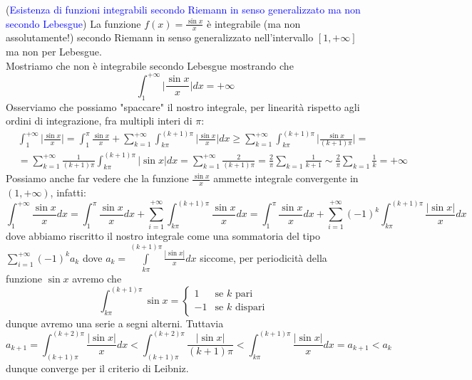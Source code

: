 \begin{remark}(\textcolor{blue}{Esistenza di funzioni integrabili secondo Riemann in senso generalizzato ma non secondo Lebesgue}) 
	La funzione $f(x) = \frac{\sin{x}}{x}$ è integrabile (ma non assolutamente!) secondo Riemann in senso generalizzato nell'intervallo $[1, +\infty]$ ma non per Lebesgue. \\
	Mostriamo che non è integrabile secondo Lebesgue mostrando che
	$$
	\int_1^{+\infty} \Big| \frac{\sin{x}}{x} \Big|dx = +\infty
	$$
	Osserviamo che possiamo "spaccare" il nostro integrale, per linearità rispetto agli ordini di integrazione, fra multipli interi di $\pi$:
	\[\begin{aligned}
	&\int_1^{+\infty} \Big| \frac{\sin{x}}{x} \Big| = \int_1^{\pi} \frac{\sin{x}}{x} + \sum_{k=1}^{+\infty} \int_{k\pi}^{(k+1)\pi} \Big|\frac{\sin{x}}{x} \Big|dx \geq \sum_{k=1}^{+\infty} \int_{k\pi}^{(k+1)\pi} \Big|\frac{\sin{x}}{(k+1)\pi} \Big| = \\
	&=\sum_{k=1}^{+\infty} \frac{1}{(k+1)\pi}\int_{k\pi}^{(k+1)\pi} |\sin{x}|dx = \sum_{k=1}^{+\infty} \frac{2}{(k+1)\pi} = \frac{2}{\pi}\sum_{k=1} \frac{1}{k+1} \sim \frac{2}{\pi} \sum_{k=1} \frac{1}{k} = +\infty
	\end{aligned}\]
	Possiamo anche far vedere che la funzione $\frac{\sin{x}}{x}$ ammette integrale convergente in $(1, +\infty)$, infatti:
	$$
	\int_1^{+\infty} \frac{\sin{x}}{x}dx = \int_1^\pi \frac{\sin{x}}{x}dx + \sum_{i=1}^{+\infty} \int_{k\pi}^{(k+1)\pi} \frac{\sin{x}}{x}dx = \int_1^{\pi} \frac{\sin{x}}{x}dx + \sum_{i=1}^{+\infty} (-1)^k \int_{k\pi}^{(k+1)\pi} \frac{|\sin{x}|}{x}dx
	$$
	dove abbiamo riscritto il nostro integrale come una sommatoria del tipo $\sum\limits_{i=1}^{+\infty} (-1)^k a_k$ dove $a_k = \int\limits_{k\pi}^{(k+1)\pi} \frac{|\sin{x}|}{x}dx$ siccome, per periodicità della funzione $\sin{x}$ avremo che
	\begin{equation*}
		\int_{k\pi}^{(k+1)\pi} \sin{x} = \begin{cases}
			1 & \text{se } k \text{ pari } \\
			-1 & \text{se } k \text{ dispari }
		\end{cases}
	\end{equation*}
	dunque avremo una serie a segni alterni. Tuttavia
	$$
	a_{k+1} = \int_{(k+1)\pi}^{(k+2)\pi} \frac{|\sin{x}|}{x} dx < \int_{(k+1)\pi}^{(k+2)\pi} \frac{|\sin{x}|}{(k+1)\pi} < \int_{k\pi}^{(k+1)\pi} \frac{|\sin{x}|}{x} dx = a_{k+1} < a_k
	$$
	dunque converge per il criterio di Leibniz.
\end{remark}
%
